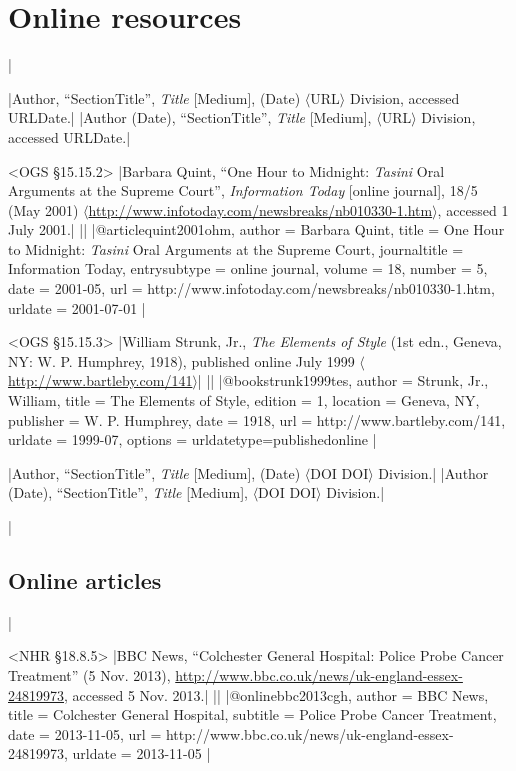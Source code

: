 \documentclass[extrafontsizes,11pt,a4paper,oneside]{memoir}
\newcommand*{\lit}[1]{\textsf{#1}}
\begin{document}
\chapter{Online resources}\label{sec:electronic}
|

\specs
|Author, \enquote{SectionTitle}, \emph{Title} [Medium], (Date) $\langle$URL$\rangle$ Division, \lit{accessed} URLDate.|%
|Author (Date), \enquote{SectionTitle}, \emph{Title} [Medium], $\langle$URL$\rangle$ Division, \lit{accessed} URLDate.|

\bibexample<OGS \S15.15.2>
|Barbara Quint, \enquote{One Hour to Midnight: \emph{Tasini} Oral Arguments at the Supreme Court}, \emph{Information Today} [online journal], 18/5 (May 2001) $\langle$\url{http://www.infotoday.com/newsbreaks/nb010330-1.htm}$\rangle$, accessed 1 July 2001.|%
||%
|@article{quint2001ohm,
  author = {Barbara Quint},
  title = {One Hour to Midnight: \emph{Tasini} Oral Arguments at the Supreme Court},
  journaltitle = {Information Today},
  entrysubtype = {online journal},
  volume = {18},
  number = {5},
  date = {2001-05},
  url = {http://www.infotoday.com/newsbreaks/nb010330-1.htm},
  urldate = {2001-07-01}
}|

\bibexample<OGS \S15.15.3>
|William Strunk, Jr., \emph{The Elements of Style} (1st edn., Geneva, NY: W. P. Humphrey, 1918), published online July 1999 $\langle$\url{http://www.bartleby.com/141}$\rangle$|%
||%
|@book{strunk1999tes,
  author = {Strunk, Jr., William},
  title = {The Elements of Style},
  edition = {1},
  location = {Geneva, NY},
  publisher = {W. P. Humphrey},
  date = {1918},
  url = {http://www.bartleby.com/141},
  urldate = {1999-07},
  options = {urldatetype=published{\space}online}
}|

\specs
|Author, \enquote{SectionTitle}, \emph{Title} [Medium], (Date) $\langle$\lit{DOI} DOI$\rangle$ Division.|%
|Author (Date), \enquote{SectionTitle}, \emph{Title} [Medium], $\langle$\lit{DOI} DOI$\rangle$ Division.|

\todoc|
\section{Online articles}
|

\bibexample<NHR \S18.8.5>
|BBC News, \enquote{Colchester General Hospital: Police Probe Cancer Treatment} (5 Nov. 2013), \url{http://www.bbc.co.uk/news/uk-england-essex-24819973}, accessed 5 Nov. 2013.|%
||%
|@online{bbc2013cgh,
  author = {{BBC News}},
  title = {Colchester General Hospital},
  subtitle = {Police Probe Cancer Treatment},
  date = {2013-11-05},
  url = {http://www.bbc.co.uk/news/uk-england-essex-24819973},
  urldate = {2013-11-05}
}|
\end{document}
